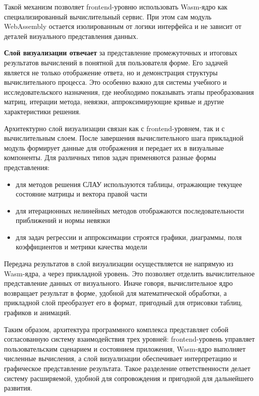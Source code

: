 \documentclass[12pt, oneside]{book}
\begin{document}
    \quad Такой механизм позволяет frontend-уровню использовать Wasm-ядро как специализированный вычислительный сервис. При этом сам модуль WebAssembly остается изолированным от логики интерфейса и не зависит от деталей визуального представления данных.

    \quad \textbf{Слой визуализации отвечает} за представление промежуточных и итоговых результатов вычислений в понятной для пользователя форме. Его задачей является не только отображение ответа, но и демонстрация структуры вычислительного процесса. Это особенно важно для системы учебного и исследовательского назначения, где необходимо показывать этапы преобразования матриц, итерации метода, невязки, аппроксимирующие кривые и другие характеристики решения.

    \quad Архитектурно слой визуализации связан как с frontend-уровнем, так и с вычислительным слоем. После завершения вычислительного шага прикладной модуль формирует данные для отображения и передает их в визуальные компоненты. Для различных типов задач применяются разные формы представления:

    \begin{itemize}
        \item для методов решения СЛАУ используются таблицы, отражающие текущее состояние матрицы и вектора правой части
        \item для итерационных нелинейных методов отображаются последовательности приближений и нормы невязки
        \item для задач регрессии и аппроксимации строятся графики, диаграммы, поля коэффициентов и метрики качества модели
    \end{itemize}


    \quad Передача результатов в слой визуализации осуществляется не напрямую из Wasm-ядра, а через прикладной уровень. Это позволяет отделить вычислительное представление данных от визуального. Иначе говоря, вычислительное ядро возвращает результат в форме, удобной для математической обработки, а прикладной слой преобразует его в формат, пригодный для отрисовки таблиц, графиков и анимаций.

    \quad Таким образом, архитектура программного комплекса представляет собой согласованную систему взаимодействия трех уровней: frontend-уровень управляет пользовательским сценарием и состоянием приложения, Wasm-ядро выполняет численные вычисления, а слой визуализации обеспечивает интерпретацию и графическое представление результата. Такое разделение ответственности делает систему расширяемой, удобной для сопровождения и пригодной для дальнейшего развития.
\end{document}
